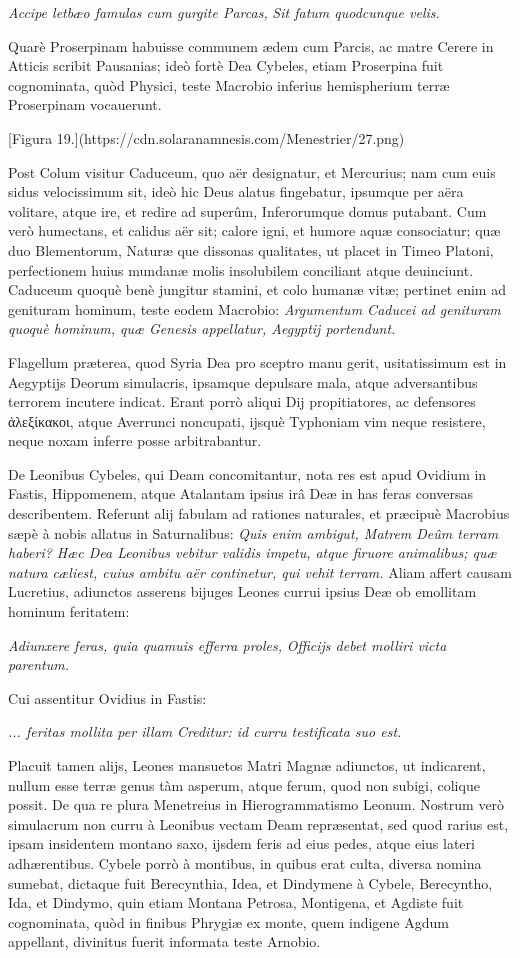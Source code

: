 \documentclass[a4paper, 11pt, oneside, polutonikogreek, latin]{article}
\begin{document}
\emph{Accipe letbæo famulas cum gurgite Parcas,}
\emph{Sit fatum quodcunque velis.}

Quarè Proserpinam habuisse communem ædem cum Parcis, ac matre Cerere in Atticis scribit Pausanias; ideò fortè Dea Cybeles, etiam Proserpina fuit cognominata, quòd Physici, teste Macrobio inferius hemispherium terræ Proserpinam vocauerunt.

[Figura 19.](https://cdn.solaranamnesis.com/Menestrier/27.png)

Post Colum visitur Caduceum, quo aër designatur, et Mercurius; nam cum euis sidus velocissimum sit, ideò hic Deus alatus fingebatur, ipsumque per aëra volitare, atque ire, et redire ad superûm, Inferorumque domus putabant. Cum verò humectans, et calidus aër sit; calore igni, et humore aquæ consociatur; quæ duo Blementorum, Naturæ que dissonas qualitates, ut placet in Timeo Platoni, perfectionem huius mundanæ molis insolubilem conciliant atque deuinciunt. Caduceum quoquè benè jungitur stamini, et colo humanæ vitæ; pertinet enim ad genituram hominum, teste eodem Macrobio: \emph{Argumentum Caducei ad genituram quoquè hominum, quæ Genesis appellatur, Aegyptij portendunt.}

Flagellum præterea, quod Syria Dea pro sceptro manu gerit, usitatissimum est in Aegyptijs Deorum simulacris, ipsamque depulsare mala, atque adversantibus terrorem incutere indicat. Erant porrò aliqui Dij propitiatores, ac defensores ἀλεξίκακοι, atque Averrunci noncupati, ijsquè Typhoniam vim neque resistere, neque noxam inferre posse arbitrabantur.

De Leonibus Cybeles, qui Deam concomitantur, nota res est apud Ovidium in Fastis, Hippomenem, atque Atalantam ipsius irâ Deæ in has feras conversas describentem. Referunt alij fabulam ad rationes naturales, et præcipuè Macrobius sæpè à nobis allatus in Saturnalibus: \emph{Quis enim ambigut, Matrem Deûm terram haberi? Hæc Dea Leonibus vebitur validis impetu, atque firuore animalibus; quæ natura cæliest, cuius ambitu aër continetur, qui vehit terram.} Aliam affert causam Lucretius, adiunctos asserens bijuges Leones currui ipsius Deæ ob emollitam hominum feritatem:

\emph{Adiunxere feras, quia quamuis efferra proles,}
\emph{Officijs debet molliri victa parentum.}

Cui assentitur Ovidius in Fastis:

\emph{... feritas mollita per illam}
\emph{Creditur: id curru testificata suo est.}

Placuit tamen alijs, Leones mansuetos Matri Magnæ adiunctos, ut indicarent, nullum esse terræ genus tàm asperum, atque ferum, quod non subigi, colique possit. De qua re plura Menetreius in Hierogrammatismo Leonum. Nostrum verò simulacrum non curru à Leonibus vectam Deam repræsentat, sed quod rarius est, ipsam insidentem montano saxo, ijsdem feris ad eius pedes, atque eius lateri adhærentibus. Cybele porrò à montibus, in quibus erat culta, diversa nomina sumebat, dictaque fuit Berecynthia, Idea, et Dindymene à Cybele, Berecyntho, Ida, et Dindymo, quin etiam Montana Petrosa, Montigena, et Agdiste fuit cognominata, quòd in finibus Phrygiæ ex monte, quem indigene Agdum appellant, divinitus fuerit informata teste Arnobio.
\end{document}
